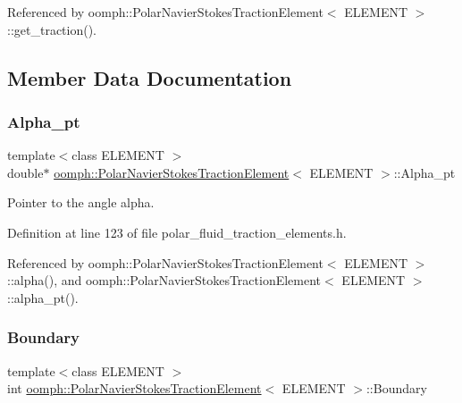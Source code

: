 Referenced by oomph\+::\+Polar\+Navier\+Stokes\+Traction\+Element$<$ E\+L\+E\+M\+E\+N\+T $>$\+::get\+\_\+traction().



\subsection{Member Data Documentation}
\mbox{\label{classoomph_1_1PolarNavierStokesTractionElement_a3d3d555530a4d6f3289b4f5408565dc6}} 
\subsubsection{\texorpdfstring{Alpha\+\_\+pt}{Alpha\_pt}}
{\footnotesize\ttfamily template$<$class E\+L\+E\+M\+E\+NT $>$ \\
double$\ast$ \hyperlink{classoomph_1_1PolarNavierStokesTractionElement}{oomph\+::\+Polar\+Navier\+Stokes\+Traction\+Element}$<$ E\+L\+E\+M\+E\+NT $>$\+::Alpha\+\_\+pt\hspace{0.3cm}{\ttfamily [protected]}}



Pointer to the angle alpha. 



Definition at line 123 of file polar\+\_\+fluid\+\_\+traction\+\_\+elements.\+h.



Referenced by oomph\+::\+Polar\+Navier\+Stokes\+Traction\+Element$<$ E\+L\+E\+M\+E\+N\+T $>$\+::alpha(), and oomph\+::\+Polar\+Navier\+Stokes\+Traction\+Element$<$ E\+L\+E\+M\+E\+N\+T $>$\+::alpha\+\_\+pt().

\mbox{\label{classoomph_1_1PolarNavierStokesTractionElement_a2dd4f7011ef970c4849ec9c6ad10373d}} 
\subsubsection{\texorpdfstring{Boundary}{Boundary}}
{\footnotesize\ttfamily template$<$class E\+L\+E\+M\+E\+NT $>$ \\
int \hyperlink{classoomph_1_1PolarNavierStokesTractionElement}{oomph\+::\+Polar\+Navier\+Stokes\+Traction\+Element}$<$ E\+L\+E\+M\+E\+NT $>$\+::Boundary\hspace{0.3cm}{\ttfamily [protected]}}




